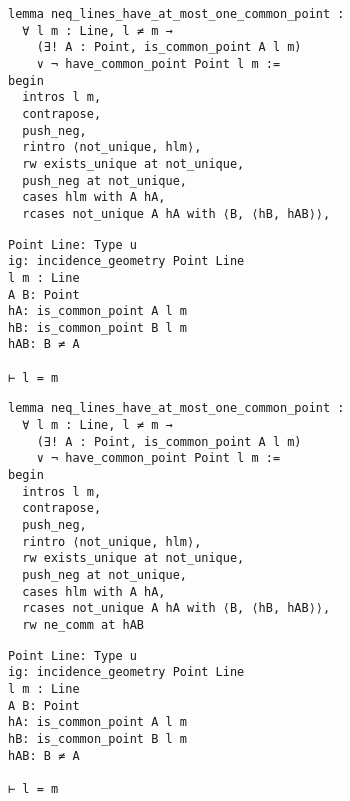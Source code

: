 \begin{frame}[fragile]
	\begin{multicols}{2}
		\begin{lstlisting}
lemma neq_lines_have_at_most_one_common_point :
  ∀ l m : Line, l ≠ m → 
    (∃! A : Point, is_common_point A l m) 
    ∨ ¬ have_common_point Point l m := 
begin
  intros l m,
  contrapose,
  push_neg,
  rintro ⟨not_unique, hlm⟩,
  rw exists_unique at not_unique,
  push_neg at not_unique,
  cases hlm with A hA,
  rcases not_unique A hA with ⟨B, ⟨hB, hAB⟩⟩,
\end{lstlisting}
		\columnbreak
		\begin{lstlisting}
Point Line: Type u
ig: incidence_geometry Point Line
l m : Line
A B: Point
hA: is_common_point A l m
hB: is_common_point B l m
hAB: B ≠ A

⊢ l = m
\end{lstlisting}
	\end{multicols}
\end{frame}










\begin{frame}[fragile]
	\begin{multicols}{2}
		\begin{lstlisting}
lemma neq_lines_have_at_most_one_common_point :
  ∀ l m : Line, l ≠ m → 
    (∃! A : Point, is_common_point A l m) 
    ∨ ¬ have_common_point Point l m := 
begin
  intros l m,
  contrapose,
  push_neg,
  rintro ⟨not_unique, hlm⟩,
  rw exists_unique at not_unique,
  push_neg at not_unique,
  cases hlm with A hA,
  rcases not_unique A hA with ⟨B, ⟨hB, hAB⟩⟩,
  rw ne_comm at hAB
\end{lstlisting}
		\columnbreak
		\begin{lstlisting}
Point Line: Type u
ig: incidence_geometry Point Line
l m : Line
A B: Point
hA: is_common_point A l m
hB: is_common_point B l m
hAB: B ≠ A

⊢ l = m
\end{lstlisting}
	\end{multicols}
\end{frame}










